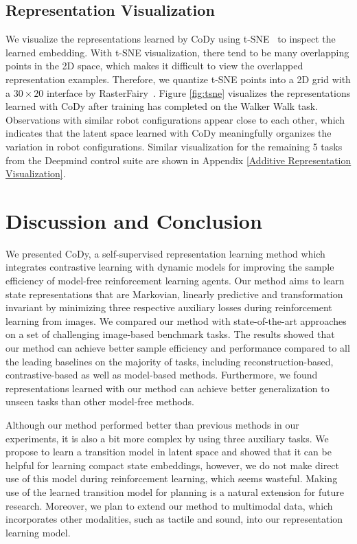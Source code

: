 \documentclass[a4paper,12pt]{article}
\begin{document}
\subsection{Representation Visualization}
\label{sec:vis}
We visualize the representations learned by CoDy using t-SNE~\cite{van2008visualizing} to inspect the learned embedding. With t-SNE visualization, there tend to be many overlapping points in the 2D space, which makes it difficult to view the overlapped representation examples. Therefore, we quantize t-SNE points into a 2D grid with a $30\times20$ interface by RasterFairy~\cite{Klingemann2015Raster}. Figure \ref{fig:tsne} visualizes the representations learned with CoDy after training has completed on the Walker Walk task. Observations with similar robot configurations appear close to each other, which indicates that the latent space learned with CoDy meaningfully organizes the variation in robot configurations. Similar visualization for the remaining 5 tasks from the Deepmind control suite are shown in Appendix \ref{Additive Representation Visualization}.

\section{Discussion and Conclusion}
\label{sec:conclusion}
We presented CoDy, a self-supervised representation learning method which integrates contrastive learning with dynamic models for improving the sample efficiency of model-free reinforcement learning agents. Our method aims to learn state representations that are Markovian, linearly predictive and transformation invariant by minimizing three respective auxiliary losses during reinforcement learning from images. We compared our method with state-of-the-art approaches on a set of challenging image-based benchmark tasks. The results showed that our method can achieve better sample efficiency and performance compared to all the leading baselines on the majority of tasks, including  reconstruction-based, contrastive-based as well as model-based methods. Furthermore, we found representations learned with our method can achieve better generalization to unseen tasks than other model-free methods. 


Although our method performed better than previous methods in our experiments, it is also a bit more complex by using three auxiliary tasks. We propose to learn a transition model in latent space and showed that it can be helpful for learning compact state embeddings, however, we do not make direct use of this model during reinforcement learning, which seems wasteful. Making use of the learned transition model for planning is a natural extension for future research. Moreover, we plan to extend our method to multimodal data, which incorporates other modalities, such as tactile and sound, into our representation learning model.
\end{document}
